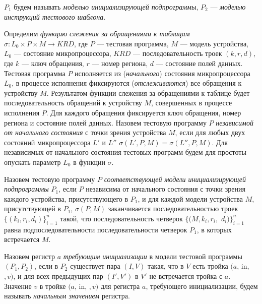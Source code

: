 $P_1$ будем называть \emph{моделью инициализирующей подпрограммы}, $P_2$ --- \emph{моделью инструкций тестового шаблона}.

Определим \emph{функцию слежения за обращениями к таблицам} $\sigma: L_0 \times P \times M \rightarrow KRD$, где $P$ --- тестовая программа, $M$ --- модель устройства, $L_0$ --- состояние микропроцессора, $KRD$ --- последовательность троек $(k, r, d)$, где $k$ --- ключ обращения, $r$ --- номер региона, $d$ --- состояние полей данных. Тестовая программа $P$ исполняется из (\emph{начального}) состояния микропроцессора $L_0$, в процессе исполнения фиксируются (\emph{отслеживаются}) все обращения к устройству $M$. Результатом функции слежения за обращениями к таблице будет последовательность обращений к устройству $M$, совершенных в процессе исполнения $P$. Для каждого обращения фиксируется ключ обращения, номер региона и состояние полей данных. Назовем тестовую программу $P$ \emph{независимой от начального состояния} с точки зрения устройства $M$, если для любых двух состояний микропроцессора $L'$ и $L''$  $\sigma(L', P, M) = \sigma(L'', P, M)$. Для независимых от начального состояния тестовых программ будем для простоты опускать параметр $L_0$ в функции $\sigma$.

Назовем тестовую программу $P$ \emph{соответствующей модели инициализирующей подпрограммы} $P_1$, если $P$ независима от начального состояния с точки зрения каждого устройства, присутствующего в $P_1$, и для каждой модели устройства $M$, присутствующей в $P_1$, $\sigma(P, M)$ заканчивается последовательностью троек $\{(k_i, r_i, d_i)\}_{i=1}^n$ такой, что последовательность четверок $\{(M, k_i, r_i,$ $d_i)\}_{i=1}^n$ равна подпоследовательности последовательности четверок $P_1$, в которых встречается $M$.

Назовем регистр $a$ \emph{требующим инициализации} в модели тестовой программы $(P_1, P_2)$, если в $P_2$ существует пара $(I, V)$ такая, что в $V$ есть тройка $(a$, in, $, v)$, и для всех предыдущих пар $(I', V')$ в $V'$ не встречается тройка с $a$. Значение $v$ в тройке $(a$, in, $, v)$ для регистра $a$, требующего инициализации, будем называть \emph{начальным значением} регистра.

